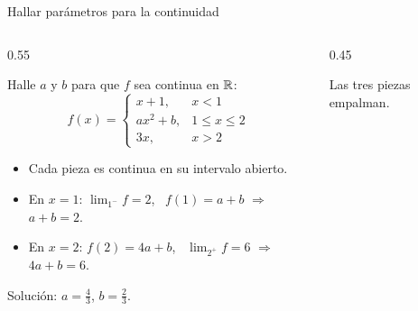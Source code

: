 \documentclass[10pt,aspectratio=169]{beamer}
\begin{document}
\begin{frame}{Hallar parámetros para la continuidad}
  \begin{columns}
    \begin{column}{0.55\textwidth}
      \begin{ejemplo}[7]
        Halle $a$ y $b$ para que $f$ sea continua en $\mathbb{R}$:
        \[ f(x)=\begin{cases}x+1,&x<1\\ ax^2+b,&1\le x\le2\\ 3x,&x>2\end{cases} \]
        \begin{itemize}
          \item Cada pieza es continua en su intervalo abierto.
          \item En $x=1$: $\lim_{1^-}f=2$, \ $f(1)=a+b$ $\Rightarrow$ $a+b=2$.
          \item En $x=2$: $f(2)=4a+b$, \ $\lim_{2^+}f=6$ $\Rightarrow$ $4a+b=6$.
        \end{itemize}
        Solución: $a=\frac43$, $b=\frac23$.
      \end{ejemplo}
    \end{column}
    \begin{column}{0.45\textwidth}
      \centering

      \small Las tres piezas empalman.
    \end{column}
  \end{columns}
\end{frame}
\end{document}
